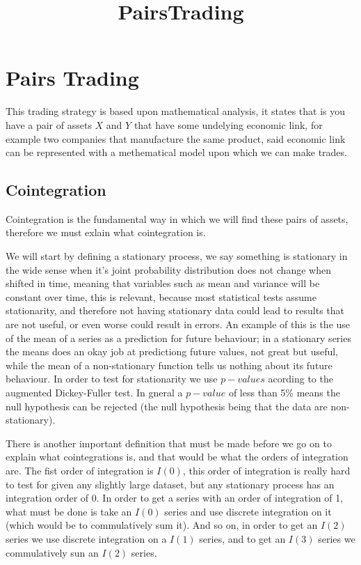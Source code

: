 \documentclass[11pt]{article}
\title{PairsTrading}
\begin{document}
    
    \maketitle
    
    

    
    \hypertarget{pairs-trading}{%
\section{Pairs Trading}\label{pairs-trading}}

This trading strategy is based upon mathematical analysis, it states
that is you have a pair of assets \(X\) and \(Y\) that have some
undelying economic link, for example two companies that manufacture the
same product, said economic link can be represented with a methematical
model upon which we can make trades.

\hypertarget{cointegration}{%
\subsection{Cointegration}\label{cointegration}}

Cointegration is the fundamental way in which we will find these pairs
of assets, therefore we must exlain what cointegration is.

We will start by defining a stationary process, we say something is
stationary in the wide sense when it's joint probability distribution
does not change when shifted in time, meaning that variables such as
mean and variance will be constant over time, this is relevant, because
most statistical tests assume stationarity, and therefore not having
stationary data could lead to results that are not useful, or even worse
could result in errors. An example of this is the use of the mean of a
series as a prediction for future behaviour; in a stationary series the
means does an okay job at predictiong future values, not great but
useful, while the mean of a non-stationary function tells us nothing
about its future behaviour. In order to test for stationarity we use
\(p-values\) acording to the augmented Dickey-Fuller test. In gneral a
\(p-value\) of less than 5\% means the null hypothesis can be rejected
(the null hypothesis being that the data are non-stationary).

There is another important definition that must be made before we go on
to explain what cointegrations is, and that would be what the orders of
integration are. The fist order of integration is \(I(0)\), this order
of integration is really hard to test for given any slightly large
dataset, but any stationary process has an integration order of 0. In
order to get a series with an order of integration of 1, what must be
done is take an \(I(0)\) series and use discrete integration on it
(which would be to commulatively sum it). And so on, in order to get an
\(I(2)\) series we use discrete integration on a \(I(1)\) series, and to
get an \(I(3)\) series we commulatively sun an \(I(2)\) series.
\end{document}
